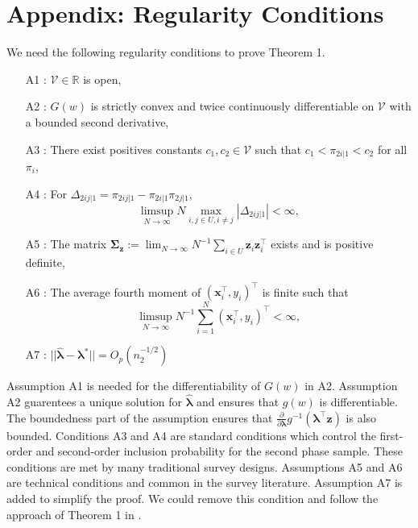 \documentclass[12pt]{article}
\newcommand{\R}{\mathbb{R}}
\renewcommand{\bf}[1]{\mathbf{#1}}
\begin{document}



\newpage
\appendix

\section{Appendix: Regularity Conditions}

We need the following regularity conditions to prove Theorem 1.

\begin{itemize}
  \item[A1]: $\mathcal{V} \in \R$ is open,
  \item[A2]: $G(w)$ is strictly convex and twice continuously differentiable on
    $\mathcal{V}$ with a bounded second derivative,
  \item[A3]: There exist positives constants $c_1, c_2 \in \mathcal{V}$ such
    that $c_1 < \pi_{2i|1} < c_2$ for all $\pi_i$,
  \item[A4]: For $\Delta_{2ij|1} = \pi_{2ij|1} - \pi_{2i|1}\pi_{2j|1}$,
    $$
    \limsup_{N \to \infty} N \max_{i, j \in U, i \neq j} |\Delta_{2ij|1}| <
    \infty,
    $$
  \item[A5]: The matrix $\bm \Sigma_{\bf z} := 
    \lim_{N \to \infty} N^{-1} \sum_{i \in U} {\bf z}_i {\bf z}_i^\top$ exists
    and is positive definite, 
  \item[A6]: The average fourth moment of $({\bf x}_i^\top, y_i)^\top$ is finite
    such that 
    $$
    \limsup_{N \to \infty} N^{-1} \sum_{i = 1}^N ({\bf x}_i^\top, y_i)^\top < \infty,
    $$
  \item[A7]: $||\hat{\bm \lambda} - \bm \lambda^*|| = O_p(n_2^{-1/2})$
\end{itemize}

Assumption A1 is needed for the differentiability of $G(w)$ in A2.
Assumption A2 guarentees a unique solution for $\hat{\bm \lambda}$ and ensures
that $g(w)$ is differentiable. The boundedness part of the assumption ensures
that $\frac{\partial}{\partial \bm \lambda} g^{-1}(\bm \lambda^\top {\bf z})$ is
also bounded. Conditions A3 and A4 are standard conditions which control the
first-order and second-order inclusion probability for the second phase sample.
These conditions are met by many traditional survey designs. Assumptions A5 and
A6 are technical conditions and common in the survey literature. Assumption A7
is added to simplify the proof. We could remove this condition and follow the
approach of Theorem 1 in \cite{kwon2024debiased}.
\end{document}
